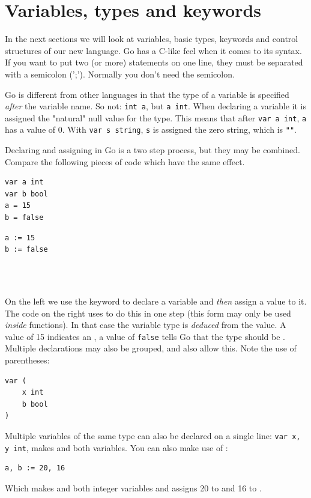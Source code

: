 \section{Variables, types and keywords}
\label{sec:vars}
In the next sections we will look at variables, basic types,
keywords and control structures of our new language. 
Go has a C-like feel when it comes to its syntax. 
If you want to put two (or more) statements on one line, they must be
separated with a semicolon (';'). Normally you don't need the semicolon.

Go is different from other languages in that the type of a variable
is specified \emph{after} the variable name. So not: 
\lstinline{int a}, but \lstinline{a int}. When declaring a variable it
is assigned the "natural" null value for the type. This means that after
\lstinline{var a int}, \lstinline{a} has a value of 0. With
\lstinline{var s string}, \lstinline{s} is assigned the zero string,
which is \lstinline{""}. 

Declaring and assigning in Go is a two step process, but they may
be combined. Compare the following pieces of code which have
the same effect. 

\begin{minipage}{.5\textwidth}
\begin{lstlisting}[linewidth=.5\textwidth,caption={Declaration with =}]
var a int
var b bool
a = 15
b = false
\end{lstlisting}
\hfill
\end{minipage}
\begin{minipage}{.5\textwidth}
\begin{lstlisting}[linewidth=.5\textwidth,caption={Declaration with :=}]
a := 15
b := false
\end{lstlisting}
\ \\
\ \\
\hfill
\end{minipage}

On the left we use the
 keyword to declare a variable and \emph{then} assign a value to
it. The code on the right uses \mbox{\key{:=}{ }} to do this in one
step (this form may only be used \emph{inside} functions).
In that case the variable
type is \emph{deduced} from the value. A value of 15 indicates an ,
a value of \texttt{false} tells Go that the type should be . 
Multiple  declarations may also be grouped, 
and  also allow this. Note the use of parentheses:
\begin{lstlisting}
var (
    x int
    b bool
)
\end{lstlisting}
Multiple variables of the same type can also be declared on a
single line: \lstinline{var x, y int}, makes  and  both
 variables. You can also make use of :
\begin{lstlisting}
a, b := 20, 16
\end{lstlisting}
Which makes  and  both integer variables and assigns
20 to  and 16 to .


